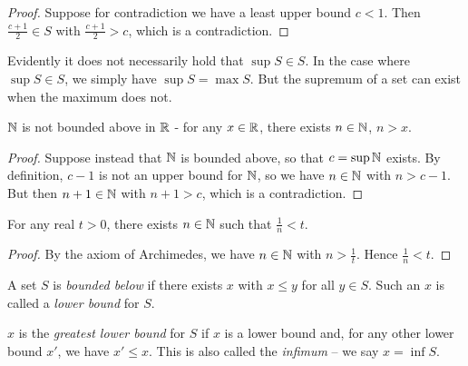 \documentclass{../template/note}
\begin{document}
    \begin{proof}
        Suppose for contradiction we have a least upper bound \(c < 1\). Then \(\frac{c+1}{2} \in S\) with \(\frac{c+1}{2} > c\), which is a contradiction.
    \end{proof}
    
    \begin{remark*}
        Evidently it does not necessarily hold that \(\sup S \in S\). In the case where \(\sup S \in S\), we simply have \(\sup S = \max S\). But the supremum of a set can exist when the maximum does not.
    \end{remark*}
    
    \begin{proposition}
        \(\mathbb N\) is not bounded above in \(\mathbb R\) - for any \(x \in \mathbb R\), there exists \(n \in \mathbb N\), \(n > x\).
        \label{archimedes}
    \end{proposition}
    
    \begin{proof}
        Suppose instead that \(\mathbb N\) is bounded above, so that \(c = \sup \mathbb N\) exists. By definition, \(c-1\) is not an upper bound for \(\mathbb N\), so we have \(n \in \mathbb N\) with \(n > c-1\). But then \(n+1 \in \mathbb N\) with \(n+1 > c\), which is a contradiction.
    \end{proof}
    
    \begin{corollary}
        For any real \(t > 0\), there exists \(n \in \mathbb N\) such that \(\frac{1}{n} < t\).
        \label{archimedes-modified}
    \end{corollary}
    
    \begin{proof}
        By the axiom of Archimedes, we have \(n \in \mathbb N\) with \(n > \frac{1}{t}\). Hence \(\frac{1}{n} < t\).
    \end{proof}
    
    \begin{definition}
        A set \(S\) is \emph{bounded below} if there exists \(x\) with \(x \leq y\) for all \(y \in S\). Such an \(x\) is called a \emph{lower bound} for \(S\).
    \end{definition}
    
    \begin{definition}
        \(x\) is the \emph{greatest lower bound} for \(S\) if \(x\) is a lower bound and, for any other lower bound \(x'\), we have \(x' \leq x\). This is also called the \emph{infimum} -- we say \(x = \inf S\).
    \end{definition}
    
\end{document}
